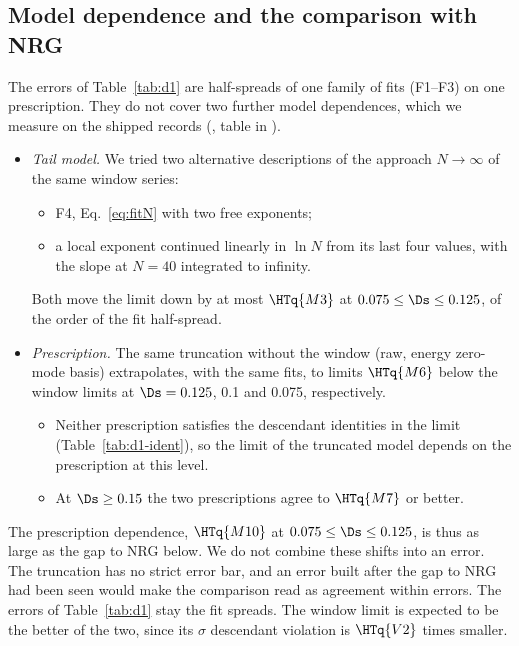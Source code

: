 \subsection{Model dependence and the comparison with NRG}\label{sec:d1-model}
The errors of Table~\ref{tab:d1} are half-spreads of one family of fits (F1--F3) on one prescription. They do not cover two
further model dependences, which we measure on the shipped records
(, table in ).
\begin{itemize}
\item \emph{Tail model.} We tried two alternative descriptions of the approach $N\to\infty$ of the same window series:
 \begin{itemize}
 \item F4, Eq.~\eqref{eq:fitN} with two free exponents;
 \item a local exponent continued linearly in $\ln N$ from its last four values, with the slope at $N=40$ integrated
 to infinity.
 \end{itemize}
 Both move the limit down by at most $\HTq{M3}$ at $0.075\le\Ds\le0.125$, of the order of the fit half-spread.
\item \emph{Prescription.} The same truncation without the window (raw, energy zero-mode basis) extrapolates, with
 the same fits, to limits $\HTq{M6}$ below the window limits at $\Ds=0.125$, 0.1 and 0.075, respectively.
 \begin{itemize}
 \item Neither prescription satisfies the descendant identities in the limit (Table~\ref{tab:d1-ident}), so the
 limit of the truncated model depends on the prescription at this level.
 \item At $\Ds\ge0.15$ the two prescriptions agree to $\HTq{M7}$ or better.
 \end{itemize}
\end{itemize}
The prescription dependence, $\HTq{M10}$ at $0.075\le\Ds\le0.125$, is thus as large as the gap to NRG below. We do
not combine these shifts into an error. The truncation has no strict error bar, and an error built after the gap to
NRG had been seen would make the comparison read as agreement within errors. The errors of Table~\ref{tab:d1} stay
the fit spreads. The window limit is expected to be the better of the two, since its $\sigma$ descendant violation is
$\HTq{V2}$ times smaller.

